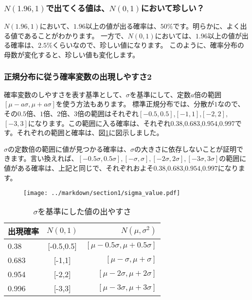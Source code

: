 \documentclass[a4paper,11pt,dvipdfmx]{jsarticle}
\begin{document}
\subsubsection{$N(1.96,1)$で出てくる値は、$N(0,1)$において珍しい？}
$N(1.96,1)$において、$1.96$以上の値が出る確率は、$50\%$です。明らかに、よく出る値であることがわかります。
一方で、$N(0,1)$においては、$1.96$以上の値が出る確率は、$2.5\%$くらいなので、珍しい値になります。
このように、確率分布の母数が変化すると、珍しい値も変化します。




\subsubsection{正規分布に従う確率変数の出現しやすさ2}
確率変数のしやすさを表す基準として、$\sigma$を基準にして、定数$a$倍の範囲$[\mu-a\sigma,\mu+a\sigma]$を使う方法もあります。
標準正規分布では、分散が$1$なので、その$0.5$倍、$1$倍、$2$倍、$3$倍の範囲はそれぞれ$[-0.5,0.5]$,$[-1,1]$,$[-2,2]$,$[-3,3]$になります。この範囲に入る確率は、それぞれ$0.38$,$0.683$,$0.954$,$0.997$です。それぞれの範囲と確率は、図\ref{fig:sigma_interval_probability}に図示しました。

$\sigma$の定数倍の範囲に値が見つかる確率は、$\sigma$の大きさに依存しないことが証明できます。言い換えれば、$[-0.5\sigma,0.5\sigma],[-\sigma,\sigma],[-2\sigma,2\sigma],[-3\sigma,3\sigma]$の範囲に値がある確率は、上記と同じで、それぞれおよそ$0.38$,$0.683$,$0.954$,$0.997$になります。


\begin{figure}
    \begin{center}
        \texttt{[image: ../markdown/section1/sigma\_value.pdf]}
        \label{fig:sigma_interval_probability}
      \end{center}
\end{figure}

\begin{table}[hbtp]
    \caption{$\sigma$を基準にした値の出やすさ}
    \centering
    \begin{tabular}{lcr}
        \hline
        出現確率  & $N(0,1)$  &  $N(\mu,\sigma^2)$ \\
        \hline \hline
        0.38 & [-0.5,0.5]  & $[\mu-0.5\sigma,\mu+0.5\sigma]$ \\
        0.683 & [-1,1] & $[\mu-\sigma,\mu+\sigma]$\\
        0.954 & [-2,2] & $[\mu-2\sigma,\mu+2\sigma]$\\
        0.996 & [-3,3] & $[\mu-3\sigma,\mu+3\sigma]$\\
    \end{tabular}
\end{table}
\end{document}
